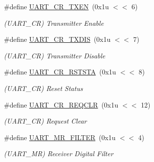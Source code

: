 \begin{DoxyCompactItemize}
\#define \mbox{\hyperlink{group__SAME70__UART_ga8a305762b980c740221e6ead8d8aee87}{U\+A\+R\+T\+\_\+\+C\+R\+\_\+\+T\+X\+EN}}~(0x1u $<$$<$ 6)
\begin{DoxyCompactList}\small\item\em (U\+A\+R\+T\+\_\+\+CR) Transmitter Enable \end{DoxyCompactList}\item 
\mbox{\label{group__SAME70__UART_gab822b68f656ad659006963366cd63ce1}} 
\#define \mbox{\hyperlink{group__SAME70__UART_gab822b68f656ad659006963366cd63ce1}{U\+A\+R\+T\+\_\+\+C\+R\+\_\+\+T\+X\+D\+IS}}~(0x1u $<$$<$ 7)
\begin{DoxyCompactList}\small\item\em (U\+A\+R\+T\+\_\+\+CR) Transmitter Disable \end{DoxyCompactList}\item 
\mbox{\label{group__SAME70__UART_gac3208ecbd03dcec5be5637b0b4e117ab}} 
\#define \mbox{\hyperlink{group__SAME70__UART_gac3208ecbd03dcec5be5637b0b4e117ab}{U\+A\+R\+T\+\_\+\+C\+R\+\_\+\+R\+S\+T\+S\+TA}}~(0x1u $<$$<$ 8)
\begin{DoxyCompactList}\small\item\em (U\+A\+R\+T\+\_\+\+CR) Reset Status \end{DoxyCompactList}\item 
\mbox{\label{group__SAME70__UART_gabed6a9339fd23c51f4a9c5106433db94}} 
\#define \mbox{\hyperlink{group__SAME70__UART_gabed6a9339fd23c51f4a9c5106433db94}{U\+A\+R\+T\+\_\+\+C\+R\+\_\+\+R\+E\+Q\+C\+LR}}~(0x1u $<$$<$ 12)
\begin{DoxyCompactList}\small\item\em (U\+A\+R\+T\+\_\+\+CR) Request Clear \end{DoxyCompactList}\item 
\mbox{\label{group__SAME70__UART_gafcaf0ef4bfb31afe00020c8b7f15fe05}} 
\#define \mbox{\hyperlink{group__SAME70__UART_gafcaf0ef4bfb31afe00020c8b7f15fe05}{U\+A\+R\+T\+\_\+\+M\+R\+\_\+\+F\+I\+L\+T\+ER}}~(0x1u $<$$<$ 4)
\begin{DoxyCompactList}\small\item\em (U\+A\+R\+T\+\_\+\+MR) Receiver Digital Filter \end{DoxyCompactList}\item 
$$
\end{DoxyCompactItemize}
